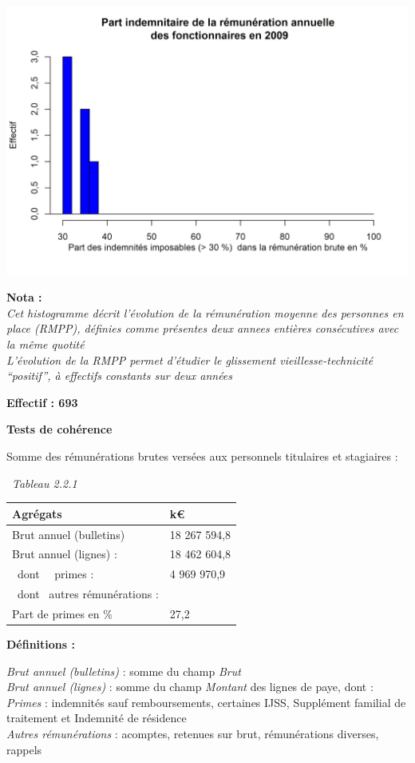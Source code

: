 \includegraphics{altair_files/figure-latex/unnamed-chunk-43-6.png}

\textbf{Nota :}\\
\emph{Cet histogramme décrit l'évolution de la rémunération moyenne des
personnes en place (RMPP), définies comme présentes deux annees entières
consécutives avec la même quotité}\\
\emph{L'évolution de la RMPP permet d'étudier le glissement
vieillesse-technicité ``positif'', à effectifs constants sur deux
années}

\textbf{Effectif : 693 }

\textbf{Tests de cohérence}

Somme des rémunérations brutes versées aux personnels titulaires et
stagiaires :

~\emph{Tableau 2.2.1}

\begin{longtable}[]{@{}ll@{}}
\toprule
Agrégats & k€\tabularnewline
\midrule
\endhead
Brut annuel (bulletins) & 18 267 594,8\tabularnewline
Brut annuel (lignes) : & 18 462 604,8\tabularnewline
~dont ~~primes : & 4 969 970,9\tabularnewline
~dont ~autres rémunérations : &\tabularnewline
Part de primes en \% & 27,2\tabularnewline
\bottomrule
\end{longtable}

\textbf{Définitions :}

\emph{Brut annuel (bulletins)} : somme du champ \emph{Brut}\\
\emph{Brut annuel (lignes)} : somme du champ \emph{Montant} des lignes
de paye, dont :\\
\emph{Primes} : indemnités sauf remboursements, certaines IJSS,
Supplément familial de traitement et Indemnité de résidence\\
\emph{Autres rémunérations} : acomptes, retenues sur brut, rémunérations
diverses, rappels

